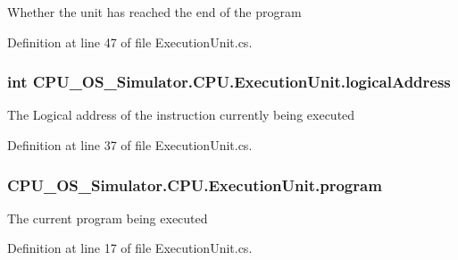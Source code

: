 Whether the unit has reached the end of the program 



Definition at line 47 of file Execution\+Unit.\+cs.

\hypertarget{class_c_p_u___o_s___simulator_1_1_c_p_u_1_1_execution_unit_aa387f2bbbf0de1c75cbd1c79e27a630c}{}
\subsubsection[{logical\+Address}]{\setlength{\rightskip}{0pt plus 5cm}int C\+P\+U\+\_\+\+O\+S\+\_\+\+Simulator.\+C\+P\+U.\+Execution\+Unit.\+logical\+Address\hspace{0.3cm}{\ttfamily [private]}}\label{class_c_p_u___o_s___simulator_1_1_c_p_u_1_1_execution_unit_aa387f2bbbf0de1c75cbd1c79e27a630c}


The Logical address of the instruction currently being executed 



Definition at line 37 of file Execution\+Unit.\+cs.

\hypertarget{class_c_p_u___o_s___simulator_1_1_c_p_u_1_1_execution_unit_a192670bee8ca089c38e9989350f658d6}{}
\subsubsection[{program}]{ C\+P\+U\+\_\+\+O\+S\+\_\+\+Simulator.\+C\+P\+U.\+Execution\+Unit.\+program\hspace{0.3cm}{\ttfamily [private]}}\label{class_c_p_u___o_s___simulator_1_1_c_p_u_1_1_execution_unit_a192670bee8ca089c38e9989350f658d6}


The current program being executed 



Definition at line 17 of file Execution\+Unit.\+cs.

